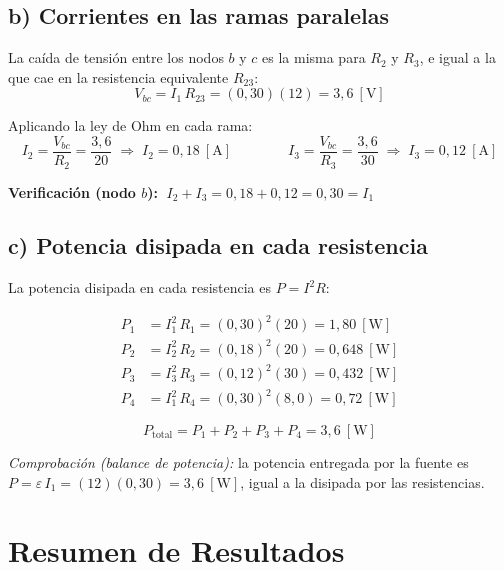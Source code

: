 \documentclass[12pt,letterpaper]{article}
\begin{document}
\subsection*{b) Corrientes en las ramas paralelas}

La ca\'ida de tensi\'on entre los nodos $b$ y $c$ es la misma para $R_2$ y $R_3$, e igual
a la que cae en la resistencia equivalente $R_{23}$:
\[
    V_{bc} = I_1\,R_{23} = (0{,}30)(12) = 3{,}6\ [\text{V}]
\]

Aplicando la ley de Ohm en cada rama:
\[
    I_2 = \frac{V_{bc}}{R_2} = \frac{3{,}6}{20}
        \;\Rightarrow\; \boxed{I_2 = 0{,}18\ [\text{A}]}
    \qquad\qquad
    I_3 = \frac{V_{bc}}{R_3} = \frac{3{,}6}{30}
        \;\Rightarrow\; \boxed{I_3 = 0{,}12\ [\text{A}]}
\]

\noindent\textbf{Verificaci\'on (nodo $b$):}
$\;I_2 + I_3 = 0{,}18 + 0{,}12 = 0{,}30 = I_1$ \checkmark

\subsection*{c) Potencia disipada en cada resistencia}

La potencia disipada en cada resistencia es $P = I^2 R$:

\begin{align*}
    P_1 &= I_1^2\,R_1 = (0{,}30)^2 (20) = 1{,}80\ [\text{W}] \\
    P_2 &= I_2^2\,R_2 = (0{,}18)^2 (20) = 0{,}648\ [\text{W}] \\
    P_3 &= I_3^2\,R_3 = (0{,}12)^2 (30) = 0{,}432\ [\text{W}] \\
    P_4 &= I_1^2\,R_4 = (0{,}30)^2 (8{,}0) = 0{,}72\ [\text{W}]
\end{align*}

\[
    \boxed{P_{\text{total}} = P_1 + P_2 + P_3 + P_4 = 3{,}6\ [\text{W}]}
\]

\noindent\small\textit{Comprobaci\'on (balance de potencia):} la potencia entregada por la
fuente es $P = \varepsilon\,I_1 = (12)(0{,}30) = 3{,}6\ [\text{W}]$, igual a la disipada
por las resistencias. \checkmark
\normalsize

\section*{Resumen de Resultados}
\end{document}
